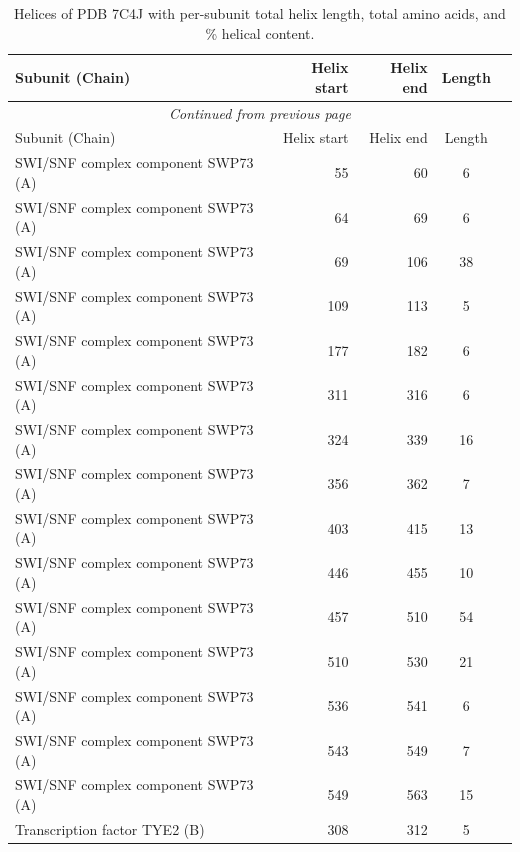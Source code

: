 \begin{longtable}{@{}p{7.5cm}rrrl@{}}
  \toprule
  Subunit (Chain) & Helix start & Helix end & \multicolumn{1}{c}{Length} \\
  \midrule
  \endfirsthead
  \multicolumn{5}{c}{\textit{Continued from previous page}} \\
  \toprule Subunit (Chain) & Helix start & Helix end & \multicolumn{1}{c}{Length} \\ \midrule
  \endhead
  \bottomrule
  \endfoot
  \bottomrule
  \caption{Helices of PDB 7C4J with per-subunit total helix length, total amino acids, and \% helical content.}
  \label{tab:7c4j_helices_v2}
  \endlastfoot
  SWI/SNF complex component SWP73 (A) & 55 & 60 & \multicolumn{1}{c}{6} \\
  SWI/SNF complex component SWP73 (A) & 64 & 69 & \multicolumn{1}{c}{6} \\
  SWI/SNF complex component SWP73 (A) & 69 & 106 & \multicolumn{1}{c}{38} \\
  SWI/SNF complex component SWP73 (A) & 109 & 113 & \multicolumn{1}{c}{5} \\
  SWI/SNF complex component SWP73 (A) & 177 & 182 & \multicolumn{1}{c}{6} \\
  SWI/SNF complex component SWP73 (A) & 311 & 316 & \multicolumn{1}{c}{6} \\
  SWI/SNF complex component SWP73 (A) & 324 & 339 & \multicolumn{1}{c}{16} \\
  SWI/SNF complex component SWP73 (A) & 356 & 362 & \multicolumn{1}{c}{7} \\
  SWI/SNF complex component SWP73 (A) & 403 & 415 & \multicolumn{1}{c}{13} \\
  SWI/SNF complex component SWP73 (A) & 446 & 455 & \multicolumn{1}{c}{10} \\
  SWI/SNF complex component SWP73 (A) & 457 & 510 & \multicolumn{1}{c}{54} \\
  SWI/SNF complex component SWP73 (A) & 510 & 530 & \multicolumn{1}{c}{21} \\
  SWI/SNF complex component SWP73 (A) & 536 & 541 & \multicolumn{1}{c}{6} \\
  SWI/SNF complex component SWP73 (A) & 543 & 549 & \multicolumn{1}{c}{7} \\
  SWI/SNF complex component SWP73 (A) & 549 & 563 & \multicolumn{1}{c}{15} \\
  Transcription factor TYE2 (B) & 308 & 312 & \multicolumn{1}{c}{5} \\

\end{longtable}
